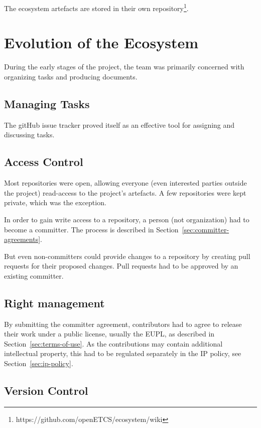 \documentclass{template/openetcs_report}
\begin{document}
The ecosystem artefacts are stored in their own repository\footnote{https://github.com/openETCS/ecosystem/wiki}.

\chapter{Evolution of the Ecosystem}

During the early stages of the project, the team was primarily concerned with organizing tasks and producing documents. 

\section{Managing Tasks}

The gitHub issue tracker proved itself as an effective tool for assigning and discussing tasks.

\section{Access Control}

Most repositories were open, allowing everyone (even interested parties outside the project) read-access to the project's artefacts. A few repositories were kept private, which was the exception.

In order to gain write access to a repository, a person (not organization) had to become a committer.  The process is described in Section~\ref{sec:committer-agreements}.

But even non-committers could provide changes to a repository by creating pull requests for their proposed changes.  Pull requests had to be approved by an existing committer.

\section{Right management}

By submitting the committer agreement, contributors had to agree to release their work under a public license, usually the EUPL, as described in Section~\ref{sec:terms-of-use}. As the contributions may contain additional intellectual property, this had to be regulated separately in the IP policy, see Section~\ref{sec:ip-policy}.

\section{Version Control}
\end{document}
